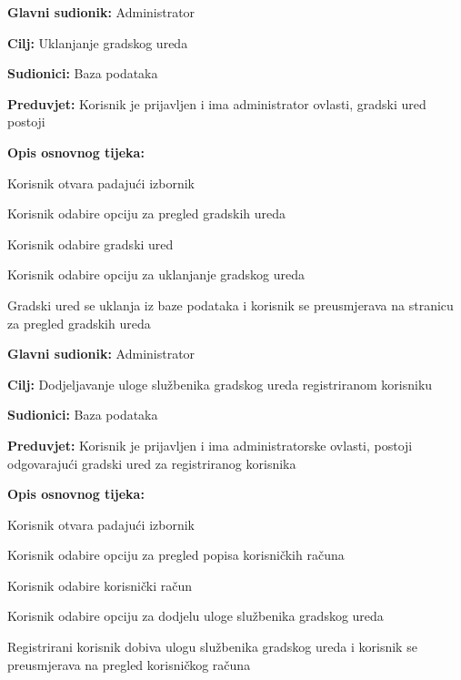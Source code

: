 \noindent {}
\begin{packed_item}

	\item \textbf{Glavni sudionik: }Administrator
	\item  \textbf{Cilj:} Uklanjanje gradskog ureda
	\item  \textbf{Sudionici:} Baza podataka
	\item  \textbf{Preduvjet:} Korisnik je prijavljen i ima administrator ovlasti, gradski ured postoji
	\item  \textbf{Opis osnovnog tijeka:}

	\item[] \begin{packed_enum}

		\item Korisnik otvara padajući izbornik
		\item Korisnik odabire opciju za pregled gradskih ureda
		\item Korisnik odabire gradski ured
		\item Korisnik odabire opciju za uklanjanje gradskog ureda 
		\item Gradski ured se uklanja iz baze podataka i korisnik se preusmjerava na stranicu za pregled gradskih ureda
	\end{packed_enum}
\end{packed_item}


\noindent {}
\begin{packed_item}

	\item \textbf{Glavni sudionik: }Administrator
	\item  \textbf{Cilj:} Dodjeljavanje uloge službenika gradskog ureda registriranom korisniku
	\item  \textbf{Sudionici:} Baza podataka
	\item  \textbf{Preduvjet:} Korisnik je prijavljen i ima administratorske ovlasti, postoji odgovarajući gradski ured za registriranog korisnika
	\item  \textbf{Opis osnovnog tijeka:}

	\item[] \begin{packed_enum}

		\item Korisnik otvara padajući izbornik 
		\item Korisnik odabire opciju za pregled popisa korisničkih računa
		\item Korisnik odabire korisnički račun
		\item Korisnik odabire opciju za dodjelu uloge službenika gradskog ureda
		\item Registrirani korisnik dobiva ulogu službenika gradskog ureda i korisnik se preusmjerava na pregled korisničkog računa
	\end{packed_enum}
\end{packed_item}


